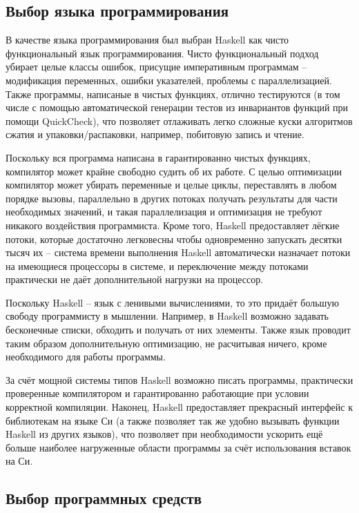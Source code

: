 \documentclass[a4paper,12pt]{article}
\numberwithin{equation}{section}
\begin{document}
\subsection{Выбор языка программирования}

В качестве языка программирования был выбран Haskell как чисто функциональный
язык программирования. Чисто функциональный подход убирает целые классы ошибок,
присущие императивным программам -- модификация переменных, ошибки указателей,
проблемы с параллелизацией. Также программы, написаные в чистых функциях,
отлично тестируются (в том числе с помощью автоматической генерации тестов из
инвариантов функций при помощи QuickCheck), что позволяет отлаживать легко
сложные куски алгоритмов сжатия и упаковки/распаковки, например, побитовую
запись и чтение.

Поскольку вся программа написана в гарантированно чистых функциях, компилятор
может крайне свободно судить об их работе. С целью оптимизации компилятор может
убирать переменные и целые циклы, переставлять в любом порядке вызовы,
параллельно в других потоках получать результаты для части необходимых значений,
и такая параллелизация и оптимизация не требуют никакого воздействия
программиста. Кроме того, Haskell предоставляет лёгкие потоки, которые
достаточно легковесны чтобы одновременно запускать десятки тысяч их -- система
времени выполнения Haskell автоматически назначает потоки на имеющиеся процессоры
в системе, и переключение между потоками практически не даёт дополнительной
нагрузки на процессор.

Поскольку Haskell -- язык с ленивыми вычислениями, то это придаёт большую
свободу программисту в мышлении. Например, в Haskell возможно задавать
бесконечные списки, обходить и получать от них элементы. Также язык проводит
таким образом дополнительную оптимизацию, не расчитывая ничего, кроме
необходимого для работы программы.

За счёт мощной системы типов Haskell возможно писать программы, практически
проверенные компилятором и гарантированно работающие при условии корректной
компиляции. Наконец, Haskell предоставляет прекрасный интерфейс к библиотекам на
языке Си (а также позволяет так же удобно вызывать функции Haskell из других
языков), что позволяет при необходимости ускорить ещё больше наиболее
нагруженные области программы за счёт использования вставок на Си.

\subsection{Выбор программных средств}
\end{document}

